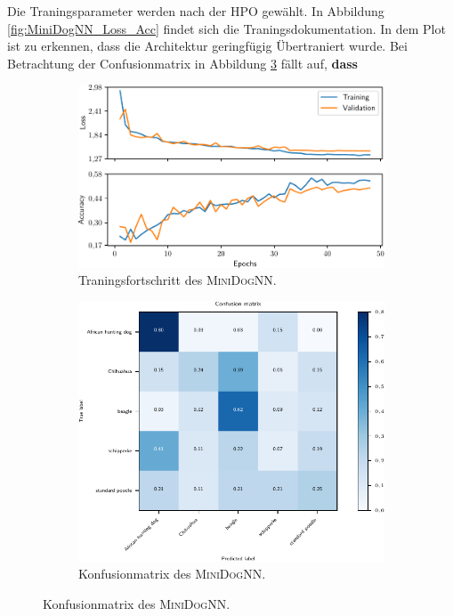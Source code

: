 Die Traningsparameter werden nach der HPO gewählt.
In Abbildung \ref{fig:MiniDogNN_Loss_Acc} findet sich die Traningsdokumentation.
In dem Plot ist zu erkennen, dass die Architektur geringfügig Übertraniert
wurde.
Bei Betrachtung der Confusionmatrix in Abbildung \ref{fig:MiniDogNN_Konfusionmatrix} fällt auf, \textbf{dass}
\begin{figure}
\centering
\begin{subfigure}{0.48\textwidth}
\centering
\includegraphics[width = \textwidth]{../../final_data/MiniNN_n5/history.pdf}
\caption{Traningsfortschritt des \textsc{MiniDogNN}.}
\label{fig:MiniDog8NN_Loss_Acc}
\end{subfigure}
\begin{subfigure}{0.48\textwidth}
\centering
\includegraphics[width = \textwidth]{../../final_data/MiniNN_n5/confusion_matrix.pdf}
\caption{Konfusionmatrix des \textsc{MiniDogNN}.}
\label{fig:MiniDogNN_Konfusionmatrix}
\end{subfigure}
\end{figure}
